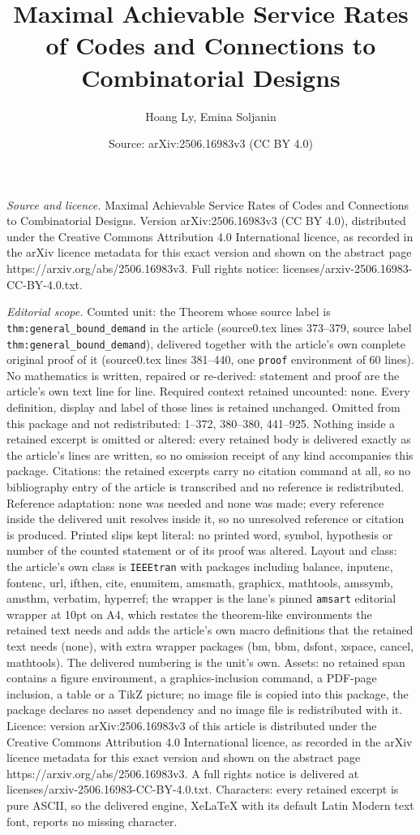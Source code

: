 \documentclass[10pt,a4paper]{amsart}
\title[Maximal Achievable Service Rates of Codes and Connections to]{Maximal Achievable Service Rates of Codes and Connections to Combinatorial Designs}
\author{Hoang Ly, Emina Soljanin}
\date{Source: arXiv:2506.16983v3 (CC BY 4.0)}
\begin{document}
\maketitle

\noindent\emph{Source and licence.} Maximal Achievable Service Rates of Codes and Connections to Combinatorial Designs. Version arXiv:2506.16983v3 (CC BY 4.0), distributed under the Creative Commons Attribution 4.0 International licence, as recorded in the arXiv licence metadata for this exact version and shown on the abstract page https://arxiv.org/abs/2506.16983v3. Full rights notice: licenses/arxiv-2506.16983-CC-BY-4.0.txt.\par\smallskip

\noindent\textit{Editorial scope.} Counted unit: the Theorem whose source label is \texttt{thm:general\_bound\_demand} in the article (source0.tex lines 373--379, source label \texttt{thm:general\_bound\_demand}), delivered together with the article's own complete original proof of it (source0.tex lines 381--440, one \texttt{proof} environment of 60 lines). No mathematics is written, repaired or re-derived: statement and proof are the article's own text line for line. Required context retained uncounted: none. Every definition, display and label of those lines is retained unchanged. Omitted from this package and not redistributed: 1--372, 380--380, 441--925. Nothing inside a retained excerpt is omitted or altered: every retained body is delivered exactly as the article's lines are written, so no omission receipt of any kind accompanies this package. Citations: the retained excerpts carry no citation command at all, so no bibliography entry of the article is transcribed and no reference is redistributed. Reference adaptation: none was needed and none was made; every reference inside the delivered unit resolves inside it, so no unresolved reference or citation is produced. Printed slips kept literal: no printed word, symbol, hypothesis or number of the counted statement or of its proof was altered. Layout and class: the article's own class is \texttt{IEEEtran} with packages including balance, inputenc, fontenc, url, ifthen, cite, enumitem, amsmath, graphicx, mathtools, amssymb, amsthm, verbatim, hyperref; the wrapper is the lane's pinned \texttt{amsart} editorial wrapper at 10pt on A4, which restates the theorem-like environments the retained text needs and adds the article's own macro definitions that the retained text needs (none), with extra wrapper packages (bm, bbm, dsfont, xspace, cancel, mathtools). The delivered numbering is the unit's own. Assets: no retained span contains a figure environment, a graphics-inclusion command, a PDF-page inclusion, a table or a TikZ picture; no image file is copied into this package, the package declares no asset dependency and no image file is redistributed with it. Licence: version arXiv:2506.16983v3 of this article is distributed under the Creative Commons Attribution 4.0 International licence, as recorded in the arXiv licence metadata for this exact version and shown on the abstract page https://arxiv.org/abs/2506.16983v3. A full rights notice is delivered at licenses/arxiv-2506.16983-CC-BY-4.0.txt. Characters: every retained excerpt is pure ASCII, so the delivered engine, XeLaTeX with its default Latin Modern text font, reports no missing character.
\end{document}
